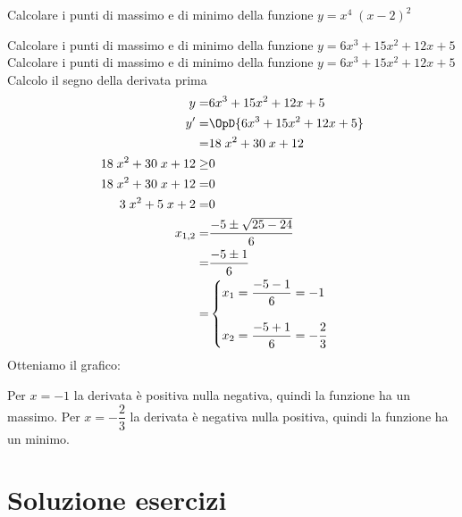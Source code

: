 \begin{exercise}[no solution]
	Calcolare i punti di massimo e di minimo della funzione $y=x^{4} \;  \left(x - 2 \right)^{2}$
\end{exercise}
\begin{exercise}
Calcolare i punti di massimo e di minimo della funzione $y=6x^3+15x^2+12x+5$
	\tcblower
Calcolare i punti di massimo e di minimo della funzione $y=6x^3+15x^2+12x+5$
Calcolo il segno della derivata prima
\begin{align*}
y=&6x^3+15x^2+12x+5\\
y'=&\OpD{6x^3+15x^2+12x+5}\\
=&18 \; x^{2} + 30 \; x + 12\\
18 \; x^{2} + 30 \; x + 12\geq&0\\
18 \; x^{2} + 30 \; x + 12=&0\\
3 \; x^{2} + 5 \; x + 2=&0\\
x_{1,2}=&\dfrac{-5\pm\sqrt{25-24}}{6}\\
=&\dfrac{-5\pm 1}{6}\\
=&\begin{cases}
x_1=\dfrac{-5-1}{6}=-1\\
\\
x_2=\dfrac{-5+1}{6}=-\dfrac{2}{3}\\
\end{cases}
\end{align*}
	Otteniamo il grafico:
\begin{center}
	
\end{center}
Per $x=-1$ la derivata è positiva nulla negativa, quindi la funzione ha un massimo. Per $x=-\dfrac{2}{3}$ la derivata è negativa nulla positiva, quindi la funzione ha un minimo. 
\end{exercise}
\tcbstoprecording
\newpage
\section{Soluzione esercizi}
\tcbinputrecords
\newpage

